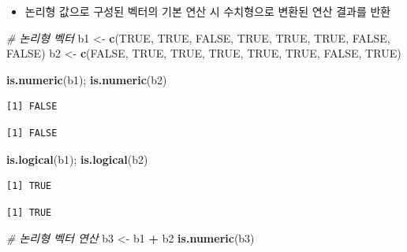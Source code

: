 \documentclass[
  11pt,
]{krantz}
\newenvironment{Shaded}{\begin{snugshade}}{\end{snugshade}}
\newcommand{\CommentTok}[1]{\textcolor[rgb]{0.37,0.37,0.37}{\textit{#1}}}
\newcommand{\KeywordTok}[1]{\textcolor[rgb]{0.27,0.27,0.27}{\textbf{#1}}}
\newcommand{\NormalTok}[1]{#1}
\newcommand{\OperatorTok}[1]{\textcolor[rgb]{0.43,0.43,0.43}{\textbf{#1}}}
\newcommand{\OtherTok}[1]{\textcolor[rgb]{0.37,0.37,0.37}{#1}}
\newcommand{\StringTok}[1]{\textcolor[rgb]{0.5,0.5,0.5}{#1}}
\providecommand{\tightlist}{%
  \setlength{\itemsep}{0pt}\setlength{\parskip}{0pt}}
\begin{document}
\normalsize

\begin{itemize}
\tightlist
\item
  논리형 값으로 구성된 벡터의 기본 연산 시 수치형으로 변환된 연산 결과를 반환
\end{itemize}

\footnotesize

\begin{Shaded}
\begin{Highlighting}[]
\CommentTok{# 논리형 벡터}
\NormalTok{b1 <-}\StringTok{ }\KeywordTok{c}\NormalTok{(}\OtherTok{TRUE}\NormalTok{, }\OtherTok{TRUE}\NormalTok{, }\OtherTok{FALSE}\NormalTok{, }\OtherTok{TRUE}\NormalTok{, }\OtherTok{TRUE}\NormalTok{, }\OtherTok{TRUE}\NormalTok{, }\OtherTok{FALSE}\NormalTok{, }\OtherTok{FALSE}\NormalTok{)}
\NormalTok{b2 <-}\StringTok{ }\KeywordTok{c}\NormalTok{(}\OtherTok{FALSE}\NormalTok{, }\OtherTok{TRUE}\NormalTok{, }\OtherTok{TRUE}\NormalTok{, }\OtherTok{TRUE}\NormalTok{, }\OtherTok{TRUE}\NormalTok{, }\OtherTok{TRUE}\NormalTok{, }\OtherTok{FALSE}\NormalTok{, }\OtherTok{TRUE}\NormalTok{)}

\KeywordTok{is.numeric}\NormalTok{(b1); }\KeywordTok{is.numeric}\NormalTok{(b2)}
\end{Highlighting}
\end{Shaded}

\begin{verbatim}
[1] FALSE
\end{verbatim}

\begin{verbatim}
[1] FALSE
\end{verbatim}

\begin{Shaded}
\begin{Highlighting}[]
\KeywordTok{is.logical}\NormalTok{(b1); }\KeywordTok{is.logical}\NormalTok{(b2)}
\end{Highlighting}
\end{Shaded}

\begin{verbatim}
[1] TRUE
\end{verbatim}

\begin{verbatim}
[1] TRUE
\end{verbatim}

\begin{Shaded}
\begin{Highlighting}[]
\CommentTok{# 논리형 벡터 연산}
\NormalTok{b3 <-}\StringTok{ }\NormalTok{b1 }\OperatorTok{+}\StringTok{ }\NormalTok{b2}
\KeywordTok{is.numeric}\NormalTok{(b3)}
\end{Highlighting}
\end{Shaded}
\end{document}
